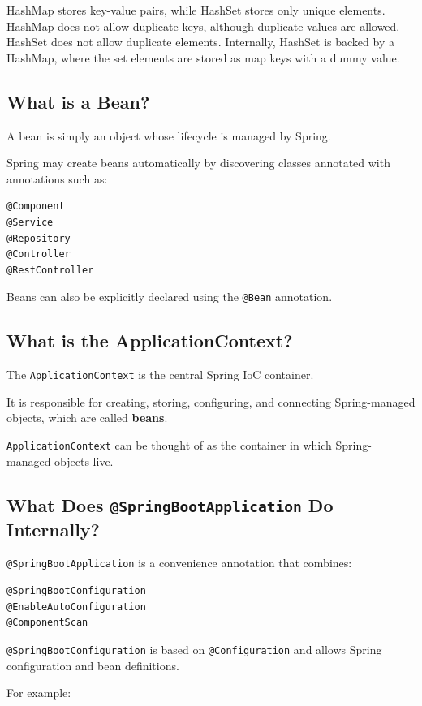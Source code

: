 \documentclass[12pt,a4paper]{article}
\begin{document}
HashMap stores key-value pairs, while HashSet stores only unique elements.
HashMap does not allow duplicate keys, although duplicate values are
allowed. HashSet does not allow duplicate elements. Internally, HashSet is
backed by a HashMap, where the set elements are stored as map keys with a
dummy value.

\subsection{What is a Bean?}

A bean is simply an object whose lifecycle is managed by Spring.

Spring may create beans automatically by discovering classes annotated
with annotations such as:

\begin{verbatim}
@Component
@Service
@Repository
@Controller
@RestController
\end{verbatim}

Beans can also be explicitly declared using the \texttt{@Bean}
annotation.

\subsection{What is the ApplicationContext?}

The \texttt{ApplicationContext} is the central Spring IoC container.

It is responsible for creating, storing, configuring, and connecting
Spring-managed objects, which are called \textbf{beans}.

\texttt{ApplicationContext} can be thought of as the
container in which Spring-managed objects live.

\subsection{What Does \texttt{@SpringBootApplication} Do Internally?}

\texttt{@SpringBootApplication} is a convenience annotation that combines:

\begin{verbatim}
@SpringBootConfiguration
@EnableAutoConfiguration
@ComponentScan
\end{verbatim}

\texttt{@SpringBootConfiguration} is based on
\texttt{@Configuration} and allows Spring configuration and bean
definitions.

For example:
\end{document}
